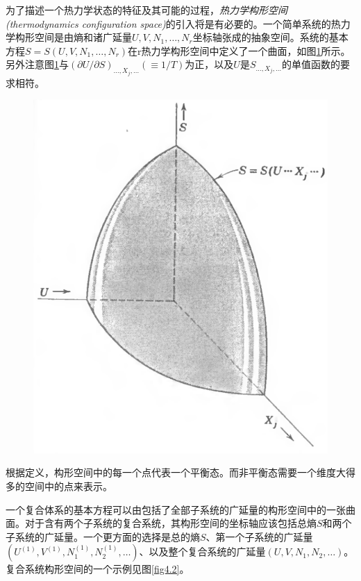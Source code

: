 为了描述一个热力学状态的特征及其可能的过程，{\it 热力学构形空间(thermodynamics configuration space)}的引入将是有必要的。一个简单系统的热力学构形空间是由熵和诸广延量$U, V, N_1,\dots ,N_r$坐标轴张成的抽象空间。系统的基本方程$S=S(U, V, N_1,\dots ,N_r)$在r热力学构形空间中定义了一个曲面，如图\ref{fig4.1}所示。另外注意图\ref{fig4.1}与$(\partial U/\partial S)_{\dots , X_j,\dots}(\equiv 1/T)$为正，以及$U$是$S_{\dots , X_j,\dots}$的单值函数的要求相符。
\begin{figure}
\includegraphics[width=.8\textwidth]{Pictures/fig4.1.png}
\label{fig4.1}
\end{figure}
根据定义，构形空间中的每一个点代表一个平衡态。而非平衡态需要一个维度大得多的空间中的点来表示。

一个复合体系的基本方程可以由包括了全部子系统的广延量的构形空间中的一张曲面。对于含有两个子系统的复合系统，其构形空间的坐标轴应该包括总熵$S$和两个子系统的广延量。一个更方面的选择是总的熵$S$、第一个子系统的广延量$(U^{(1)},V^{(1)},N^{(1)}_1,N^{(1)}_2,\dots)$、以及整个复合系统的广延量$(U,V,N_1,N_2,\dots)$。复合系统构形空间的一个示例见图\ref{fig4.2}。

